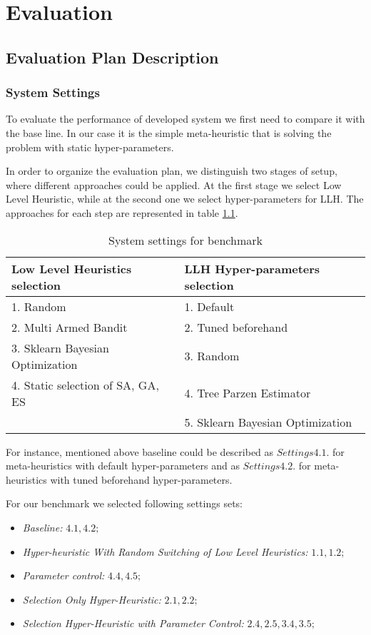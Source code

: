 \chapter{Evaluation}


\section{Evaluation Plan Description}

\subsection{System Settings}
To evaluate the performance of developed system we first need to compare it with the base line. In our case it is the simple meta-heuristic that is solving the problem with static hyper-parameters.

In order to organize the evaluation plan, we distinguish two stages of setup, where different approaches could be applied. 
At the first stage we select Low Level Heuristic, while at the second one we select hyper-parameters for LLH.
The approaches for each step are represented in table \ref{evaluation: settings table}.

\begin{table}[h!]
	\centering
	\begin{tabular}{|l|l|}
		\hline
		\textbf{Low Level Heuristics selection} & \textbf{LLH Hyper-parameters selection} \\
		\hline
		1. Random & 1. Default \\
		2. Multi Armed Bandit & 2. Tuned beforehand \\
		3. Sklearn Bayesian Optimization & 3. Random \\
		4. Static selection of SA, GA, ES & 4. Tree Parzen Estimator \\
		& 5. Sklearn Bayesian Optimization\\
		\hline
	\end{tabular}
	
	\caption{System settings for benchmark}
	\label{evaluation: settings table}
\end{table}


For instance, mentioned above baseline could be described as $Settings 4.1.$ for meta-heuristics with default hyper-parameters and as $Settings 4.2.$ for meta-heuristics with tuned beforehand hyper-parameters.

For our benchmark we selected following settings sets:

\begin{itemize}
	\item \textit{Baseline:} $4.1, 4.2;$
	\item \textit{Hyper-heuristic With Random Switching of Low Level Heuristics:} $1.1, 1.2;$
	\item \textit{Parameter control:} $4.4, 4.5;$
	\item \textit{Selection Only Hyper-Heuristic:} $2.1, 2.2;$
	\item \textit{Selection Hyper-Heuristic with Parameter Control:} $2.4, 2.5, 3.4, 3.5;$
\end{itemize}

